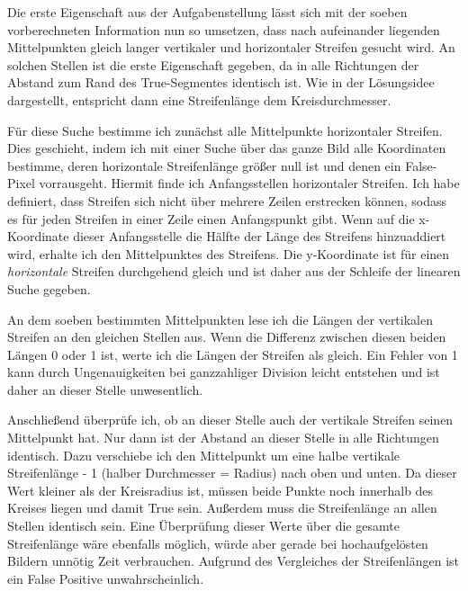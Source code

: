 Die erste Eigenschaft aus der Aufgabenstellung lässt sich mit der soeben vorberechneten Information nun so umsetzen, dass nach aufeinander liegenden Mittelpunkten gleich langer vertikaler und horizontaler Streifen gesucht wird.
An solchen Stellen ist die erste Eigenschaft gegeben, da in alle Richtungen der Abstand zum Rand des True-Segmentes identisch ist. Wie in der Lösungsidee dargestellt, entspricht dann eine Streifenlänge dem Kreisdurchmesser.

Für diese Suche bestimme ich zunächst alle Mittelpunkte horizontaler Streifen. Dies geschieht, indem ich mit einer Suche über das ganze Bild alle Koordinaten bestimme, deren horizontale Streifenlänge größer null ist und denen ein False-Pixel vorrausgeht.
Hiermit finde ich Anfangsstellen horizontaler Streifen. Ich habe definiert, dass Streifen sich nicht über mehrere Zeilen erstrecken können, sodass es für jeden Streifen in einer Zeile einen Anfangspunkt gibt.
Wenn auf die x-Koordinate dieser Anfangsstelle die Hälfte der Länge des Streifens hinzuaddiert wird, erhalte ich den Mittelpunktes des Streifens.
Die y-Koordinate ist für einen \textit{horizontale} Streifen durchgehend gleich und ist daher aus der Schleife der linearen Suche gegeben.

An dem soeben bestimmten Mittelpunkten lese ich die Längen der vertikalen Streifen an den gleichen Stellen aus. Wenn die Differenz zwischen diesen beiden Längen 0 oder 1 ist, werte ich die Längen der Streifen als gleich.
Ein Fehler von 1 kann durch Ungenauigkeiten bei ganzzahliger Division leicht entstehen und ist daher an dieser Stelle unwesentlich.

Anschließend überprüfe ich, ob an dieser Stelle auch der vertikale Streifen seinen Mittelpunkt hat. Nur dann ist der Abstand an dieser Stelle in alle Richtungen identisch. Dazu verschiebe ich den Mittelpunkt um eine halbe vertikale Streifenlänge - 1 (halber Durchmesser = Radius) nach oben und unten. Da dieser Wert kleiner als der Kreisradius ist, müssen beide Punkte noch innerhalb des Kreises liegen und damit True sein. Außerdem muss die Streifenlänge an allen Stellen identisch sein.
Eine Überprüfung dieser Werte über die gesamte Streifenlänge wäre ebenfalls möglich, würde aber gerade bei hochaufgelösten Bildern unnötig Zeit verbrauchen. Aufgrund des Vergleiches der Streifenlängen ist ein False Positive unwahrscheinlich.

